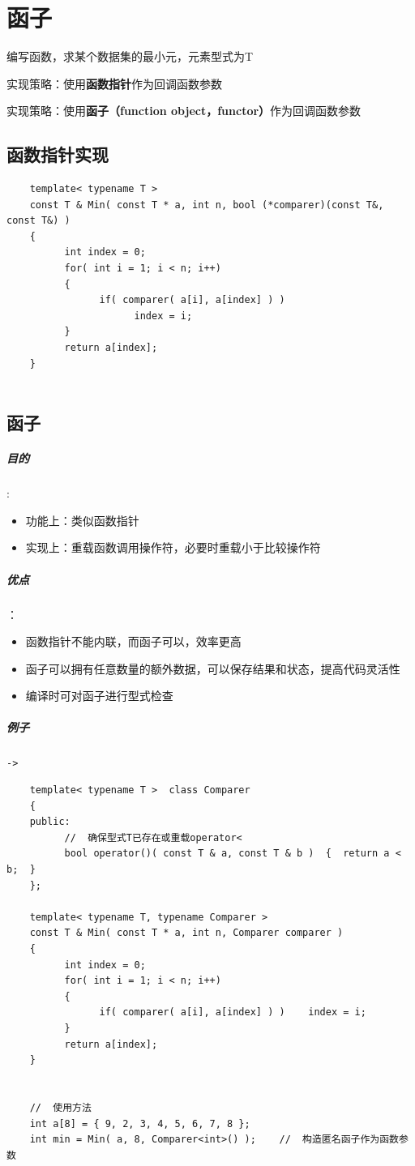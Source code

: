 \documentclass[UTF8,a4paper,12pt]{ctexbook}
\begin{document}
\section{函子}
	编写函数，求某个数据集的最小元，元素型式为T
	
	实现策略：使用\textbf{函数指针}作为回调函数参数
	
	实现策略：使用\textbf{函子（function object，functor）}作为回调函数参数
	
	\subsection{函数指针实现}
		\begin{lstlisting}
	template< typename T >
	const T & Min( const T * a, int n, bool (*comparer)(const T&, const T&) )
	{
		  int index = 0;
		  for( int i = 1; i < n; i++)
		  {
			    if( comparer( a[i], a[index] ) )
				      index = i;
		  }
		  return a[index];
	}
	
		\end{lstlisting}
	
	\subsection{函子}
		\subparagraph{目的}:
			\begin{itemize}
				\item 功能上：类似函数指针
				
				\item 实现上：重载函数调用操作符，必要时重载小于比较操作符
			\end{itemize}
			
		\subparagraph{优点}：
			\begin{itemize}
				\item 函数指针不能内联，而函子可以，效率更高
				
				\item 函子可以拥有任意数量的额外数据，可以保存结果和状态，提高代码灵活性
				
				\item 编译时可对函子进行型式检查
			\end{itemize}
			
		\subparagraph{例子}\verb|->|
		
			\begin{lstlisting}
	template< typename T >  class Comparer
	{
	public:
		  //  确保型式T已存在或重载operator<
		  bool operator()( const T & a, const T & b )  {  return a < b;  }
	};
	
	template< typename T, typename Comparer >
	const T & Min( const T * a, int n, Comparer comparer )
	{
		  int index = 0;
		  for( int i = 1; i < n; i++)
		  {
			    if( comparer( a[i], a[index] ) )    index = i;
		  }
		  return a[index];
	}
	
	
	//  使用方法
	int a[8] = { 9, 2, 3, 4, 5, 6, 7, 8 };
	int min = Min( a, 8, Comparer<int>() );    //  构造匿名函子作为函数参数
			\end{lstlisting}		
			
\end{document}
